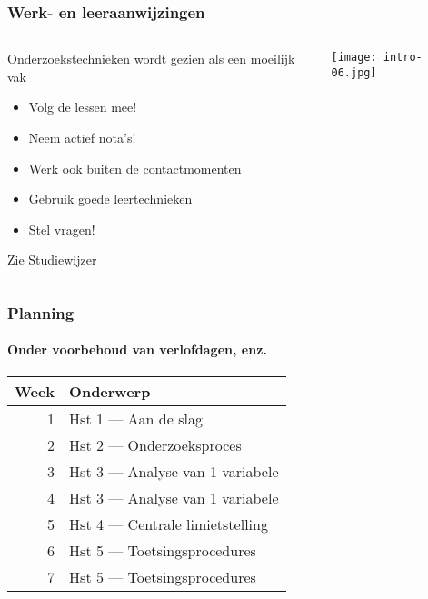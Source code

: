 \documentclass[aspectratio=169]{beamer}
\begin{document}
\begin{frame}
  \frametitle{Werk- en leeraanwijzingen}
  
  \begin{columns}
    \begin{column}{.8\textwidth}
        Onderzoekstechnieken wordt gezien als een moeilijk vak
      
      \begin{itemize}
        \item Volg de lessen mee!
        \item Neem actief nota's!
        \item Werk ook buiten de contactmomenten
        \item Gebruik goede leertechnieken
        \item Stel vragen!
      \end{itemize}
      
      \bigskip

      Zie Studiewijzer
      
    \end{column}
  
    \begin{column}{.2\textwidth}
      \texttt{[image: intro-06.jpg]}
    \end{column}
  \end{columns}
  
\end{frame}

\begin{frame}
  \frametitle{Planning}
  \framesubtitle{Onder voorbehoud van verlofdagen, enz.}
  
  \centering
  \begin{tabular}{rl}
    \toprule
    \textbf{Week} & \textbf{Onderwerp}                \\
    \midrule
      1 & Hst 1 --- Aan de slag              \\
      2 & Hst 2 --- Onderzoeksproces         \\
      3 & Hst 3 --- Analyse van 1 variabele  \\
      4 & Hst 3 --- Analyse van 1 variabele  \\
      5 & Hst 4 --- Centrale limietstelling  \\
      6 & Hst 5 --- Toetsingsprocedures      \\
      7 & Hst 5 --- Toetsingsprocedures      \\
  \end{tabular}
  
\end{frame}
\end{document}
